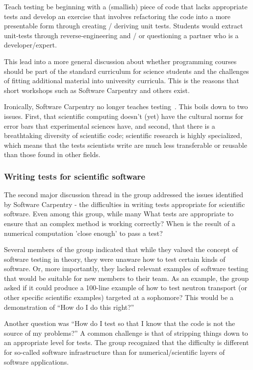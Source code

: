 \documentclass[11pt, oneside]{amsart}
\begin{document}
Teach testing be beginning with a (smallish) 
piece of code that lacks appropriate tests and develop an exercise that involves 
refactoring the code into a more presentable form through creating / deriving unit 
tests. Students would extract unit-tests through reverse-engineering and / or 
questioning a partner who is a developer/expert.  

This lead into a more general discussion about whether programming courses should be part of the standard curriculum for science students and the challenges of fitting additional material into university curricula. This is the reasons that short workshops such as Software Carpentry and others exist. 

Ironically, Software Carpentry no longer teaches testing~\cite{SCtesting}. This boils down to two issues.  First, that scientific computing doesn't (yet) have the cultural norms for error bars that experimental sciences have, and second, that there is a breathtaking diversity of scientific code; scientific research is highly specialized, which means that the tests scientists write are much less transferable or reusable than those found in other fields. 

\subsubsection{Writing tests for scientific software}
The second major discussion thread in the group addressed the issues identified by Software Carpentry - the difficulties in writing tests appropriate for scientific software. Even among this group, while many What tests are appropriate to ensure that an complex method is working correctly? When is the result of a numerical computation 'close enough' to pass a test?
 
Several members of the group indicated that while they valued the
concept of software testing in theory, they were unaware how to test
certain kinds of software.
Or, more importantly, they lacked relevant examples of software
testing that would be suitable for new members to their team.
As an example, the group asked if it could produce a 100-line example of how to test
neutron transport (or other specific scientific examples) targeted at
a sophomore? This would be a demonstration of ``How do I do this
right?''

Another question was ``How do I test so that I know that the code is
not the source of my problems?''  A common challenge is that of
stripping things down to an appropriate level for tests.  The group
recognized that the difficulty is different for so-called software
infrastructure than for numerical/scientific layers of software
applications.
\end{document}
